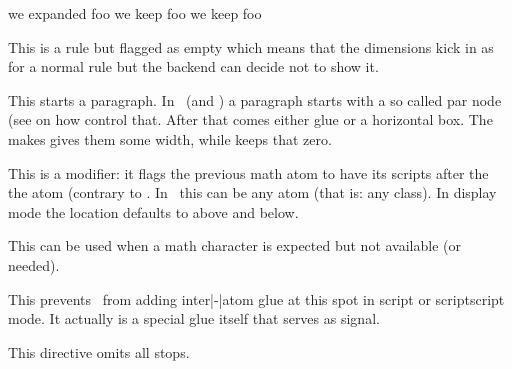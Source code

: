 \startbuffer
          \def\foo{foo} \edef\oof{we expanded      \foo} \meaning\oof
          \def\foo{foo} \edef\oof{we keep \noexpand\foo} \meaning\oof
\protected\def\foo{foo} \edef\oof{we keep          \foo} \meaning\oof
\stopbuffer

\typebuffer

\startlines
\getbuffer
\stoplines

\stopoldprimitive

\startnewprimitive[title={\prm {nohrule}}]

This is a rule but flagged as empty which means that the dimensions kick in as
for a normal rule but the backend can decide not to show it.

\stopnewprimitive

\startoldprimitive[title={\prm {noindent}}]

This starts a paragraph. In \LUATEX\ (and \LUAMETATEX) a paragraph starts with a
so called par node (see  on how control that. After that comes
either  glue or a horizontal box. The  makes gives
them some width, while  keeps that zero.

\stopoldprimitive

\startoldprimitive[title={\prm {nolimits}}]

This is a modifier: it flags the previous math atom to have its scripts after the
the atom (contrary to . In \LUAMETATEX\ this can be any atom (that
is: any class). In display mode the location defaults to above and below.

\stopoldprimitive

\startnewprimitive[title={\prm {nomathchar}}]

This can be used when a math character is expected but not available (or needed).

\stopnewprimitive

\startoldprimitive[title={\prm {nonscript}}]

This prevents \TEX\ from adding inter|-|atom glue at this spot in script or
scriptscript mode. It actually is a special glue itself that serves as signal.

\stopoldprimitive

\startoldprimitive[title={\prm {nonstopmode}}]

This directive omits all stops.

\stopoldprimitive

\startnewprimitive[title={\prm {nooutputboxerror}}]

